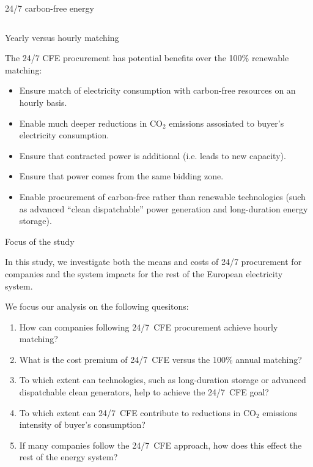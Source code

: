 \begin{frame}{24/7 carbon-free energy}
\begin{columns}[T]
  \end{columns}
  
\end{frame}


\begin{frame}{Yearly versus hourly matching}
  
  The 24/7 CFE procurement has potential benefits over the 100\% renewable matching:
  
  \begin{itemize}
  \item Ensure match of electricity consumption with carbon-free resources 
        on an \alert{hourly basis}.
  \item Enable much \alert{deeper reductions in CO$_2$} emissions assosiated 
        to buyer's electricity consumption.
  \item Ensure that contracted power is \alert{additional} (i.e. leads to new capacity).
  \item Ensure that power comes from the \alert{same bidding zone}.
  \item Enable procurement of \alert{carbon-free} rather than renewable technologies 
        (such as advanced “clean dispatchable” power generation and long-duration energy storage).
  \end{itemize}
  
\end{frame}


\begin{frame}{Focus of the study}
  
  In this study, we investigate both the \alert{means and costs of 24/7 procurement} for companies
  and the \alert{system impacts} for the rest of the European electricity system. 

  We focus our analysis on the following quesitons:

    \begin{enumerate}
    \item How can companies following 24/7~CFE procurement achieve hourly matching?
    \item What is the cost premium of 24/7~CFE versus the 100\% annual matching?
    \item To which extent can technologies, such as long-duration storage or advanced dispatchable
          clean generators, help to achieve the 24/7~CFE goal?
    \item To which extent can 24/7~CFE contribute to reductions in CO$_2$
          emissions intensity of buyer's consumption? 
    \item If many companies follow the 24/7~CFE approach, how does this effect the rest of
          the energy system?
    \end{enumerate}
  
\end{frame}



